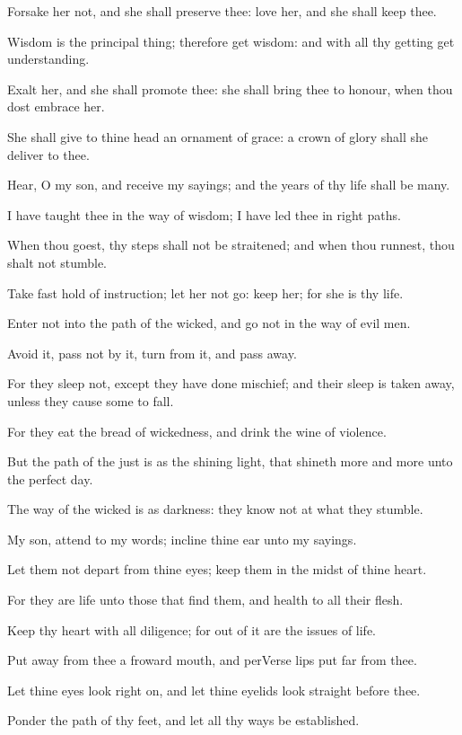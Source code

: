 \Verse Forsake her not, and she shall preserve thee: love her, and she shall keep thee.

\Verse Wisdom is the principal thing; therefore get wisdom: and with all thy getting get understanding.

\Verse Exalt her, and she shall promote thee: she shall bring thee to honour, when thou dost embrace her.

\Verse She shall give to thine head an ornament of grace: a crown of glory shall she deliver to thee.

\Verse Hear, O my son, and receive my sayings; and the years of thy life shall be many.

\Verse I have taught thee in the way of wisdom; I have led thee in right paths.

\Verse When thou goest, thy steps shall not be straitened; and when thou runnest, thou shalt not stumble.

\Verse Take fast hold of instruction; let her not go: keep her; for she is thy life.

\Verse Enter not into the path of the wicked, and go not in the way of evil men.

\Verse Avoid it, pass not by it, turn from it, and pass away.

\Verse For they sleep not, except they have done mischief; and their sleep is taken away, unless they cause some to fall.

\Verse For they eat the bread of wickedness, and drink the wine of violence.

\Verse But the path of the just is as the shining light, that shineth more and more unto the perfect day.

\Verse The way of the wicked is as darkness: they know not at what they stumble.

\Verse My son, attend to my words; incline thine ear unto my sayings.

\Verse Let them not depart from thine eyes; keep them in the midst of thine heart.

\Verse For they are life unto those that find them, and health to all their flesh.

\Verse Keep thy heart with all diligence; for out of it are the issues of life.

\Verse Put away from thee a froward mouth, and perVerse lips put far from thee.

\Verse Let thine eyes look right on, and let thine eyelids look straight before thee.

\Verse Ponder the path of thy feet, and let all thy ways be established.

